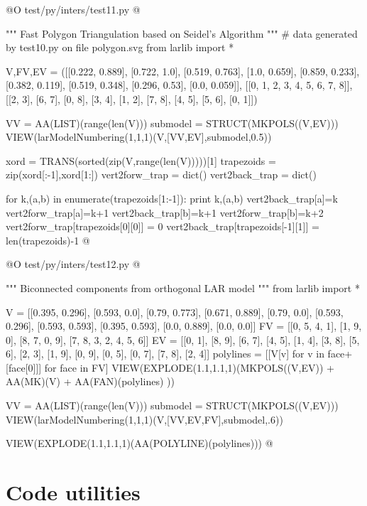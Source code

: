 \documentclass[11pt,oneside]{article}    %
\begin{document}
@O test/py/inters/test11.py
@{""" Fast Polygon Triangulation based on Seidel's Algorithm """
# data generated by test10.py on file polygon.svg
from larlib import *

V,FV,EV = ([[0.222, 0.889],
  [0.722, 1.0],
  [0.519, 0.763],
  [1.0, 0.659],
  [0.859, 0.233],
  [0.382, 0.119],
  [0.519, 0.348],
  [0.296, 0.53],
  [0.0, 0.059]],
 [[0, 1, 2, 3, 4, 5, 6, 7, 8]],
 [[2, 3], [6, 7], [0, 8], [3, 4], [1, 2], [7, 8], [4, 5], [5, 6], [0, 1]])
 
VV = AA(LIST)(range(len(V)))
submodel = STRUCT(MKPOLS((V,EV)))
VIEW(larModelNumbering(1,1,1)(V,[VV,EV],submodel,0.5))

 
xord = TRANS(sorted(zip(V,range(len(V)))))[1]
trapezoids = zip(xord[:-1],xord[1:])
vert2forw_trap = dict()
vert2back_trap = dict()

for k,(a,b) in enumerate(trapezoids[1:-1]):
    print k,(a,b)
    vert2back_trap[a]=k
    vert2forw_trap[a]=k+1
    vert2back_trap[b]=k+1
    vert2forw_trap[b]=k+2
vert2forw_trap[trapezoids[0][0]] = 0
vert2back_trap[trapezoids[-1][1]] = len(trapezoids)-1
@}


@O test/py/inters/test12.py
@{""" Biconnected components from orthogonal LAR model """
from larlib import *

V = [[0.395, 0.296], [0.593, 0.0], [0.79, 0.773], [0.671, 0.889], [0.79, 0.0], [0.593, 0.296], [0.593, 0.593], [0.395, 0.593], [0.0, 0.889], [0.0, 0.0]]
FV = [[0, 5, 4, 1], [1, 9, 0], [8, 7, 0, 9], [7, 8, 3, 2, 4, 5, 6]]
EV = [[0, 1], [8, 9], [6, 7], [4, 5], [1, 4], [3, 8], [5, 6], [2, 3], [1, 9], [0, 9], [0, 5], [0, 7], [7, 8], [2, 4]]
polylines = [[V[v] for v in face+[face[0]]] for face in FV]
VIEW(EXPLODE(1.1,1.1,1)(MKPOLS((V,EV)) + AA(MK)(V) + AA(FAN)(polylines) ))

VV = AA(LIST)(range(len(V)))
submodel = STRUCT(MKPOLS((V,EV)))
VIEW(larModelNumbering(1,1,1)(V,[VV,EV,FV],submodel,.6))

VIEW(EXPLODE(1.1,1.1,1)(AA(POLYLINE)(polylines)))
@}

\appendix
\section{Code utilities}
\end{document}
